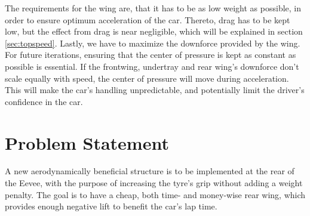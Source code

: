   The requirements for the wing are, that it has to be as low weight as possible, in order to ensure optimum acceleration of the car. Thereto, drag has to be kept low, but the effect from drag is near negligible, which will be explained in section \ref{sec:topspeed}. Lastly, we have to maximize the downforce provided by the wing. For future iterations, ensuring that the center of pressure is kept as constant as possible is essential. If the frontwing, undertray and rear wing's downforce don't scale equally with speed, the center of pressure will move during acceleration. This will make the car's handling unpredictable, and potentially limit the driver's confidence in the car.

\section{Problem Statement}

  A new aerodynamically beneficial structure is to be implemented at the rear of the Eevee, with the purpose of increasing the tyre's grip without adding a weight penalty. The goal is to have a cheap, both time- and money-wise rear wing, which provides enough negative lift to benefit the car's lap time.
